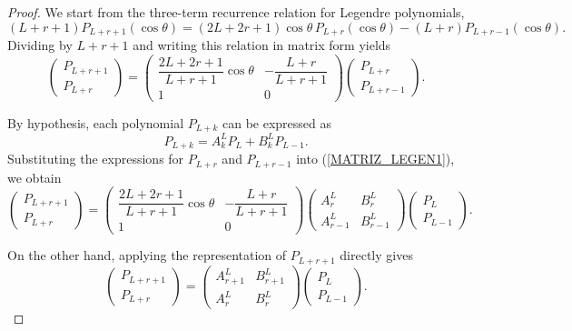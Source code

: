 \documentclass[11pt]{article}
\renewcommand\eqref[1]{(\ref{#1})} %
\theoremstyle{definition}
\theoremstyle{remark}
\numberwithin{equation}{section}
\begin{document}
\begin{proof}
We start from the three-term recurrence relation for Legendre polynomials,
\[
(L+r+1) P_{L+r+1}(\cos\theta)
= (2L+2r+1)\cos\theta\, P_{L+r}(\cos\theta)
- (L+r) P_{L+r-1}(\cos\theta).
\]
Dividing by $L+r+1$ and writing this relation in matrix form yields
\begin{equation}\label{MATRIZ_LEGEN1}
\begin{pmatrix}
P_{L+r+1} \\
P_{L+r}
\end{pmatrix}
=
\begin{pmatrix}
\dfrac{2L+2r+1}{L+r+1}\cos\theta &
-\dfrac{L+r}{L+r+1} \\
1 & 0
\end{pmatrix}
\begin{pmatrix}
P_{L+r} \\
P_{L+r-1}
\end{pmatrix}.
\end{equation}

By hypothesis, each polynomial $P_{L+k}$ can be expressed as
\[
P_{L+k}
= A_k^L P_L + B_k^L P_{L-1}.
\]
Substituting the expressions for $P_{L+r}$ and $P_{L+r-1}$ into
\eqref{MATRIZ_LEGEN1}, we obtain
\begin{equation}\label{EQmatrix1}
\begin{pmatrix}
P_{L+r+1} \\
P_{L+r}
\end{pmatrix}
=
\begin{pmatrix}
\dfrac{2L+2r+1}{L+r+1}\cos\theta &
-\dfrac{L+r}{L+r+1} \\
1 & 0
\end{pmatrix}
\begin{pmatrix}
A_r^L & B_r^L \\
A_{r-1}^L & B_{r-1}^L
\end{pmatrix}
\begin{pmatrix}
P_L \\
P_{L-1}
\end{pmatrix}.
\end{equation}

On the other hand, applying the representation of $P_{L+r+1}$ directly gives
\[
\begin{pmatrix}
P_{L+r+1} \\
P_{L+r}
\end{pmatrix}
=
\begin{pmatrix}
A_{r+1}^L & B_{r+1}^L \\
A_r^L & B_r^L
\end{pmatrix}
\begin{pmatrix}
P_L \\
P_{L-1}
\end{pmatrix}.
\]


\end{proof}
\end{document}
